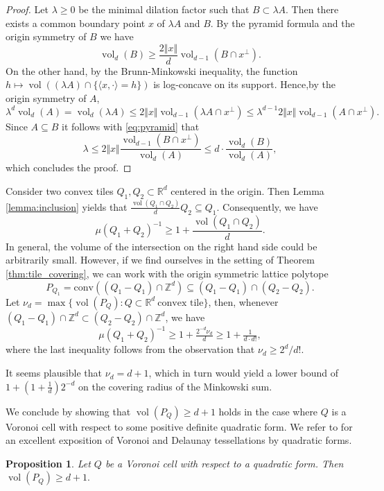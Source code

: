 \documentclass[11pt, a4paper]{amsart}
\newcommand{\RR}{\mathbb{R}}
\newcommand{\ZZ}{\mathbb{Z}}
\newcommand{\conv}{\mathrm{conv}}
\DeclareMathOperator{\vol}{vol}
\numberwithin{equation}{section}
\theoremstyle{plain}
\newtheorem{proposition}[theorem]{Proposition}
\begin{document}
\begin{proof}
Let $\lambda \geq 0$ be the minimal dilation factor such that $B\subset \lambda A$. Then there exists a common boundary point $x$ of $\lambda A$ and $B$. By the pyramid formula and the origin symmetry of $B$ we have
\begin{equation}
\label{eq:pyramid}
\vol_d(B) \geq \frac{2 \Vert x\Vert}{d}\vol_{d-1}(B\cap x^\perp).
\end{equation}
On the other hand, by the Brunn-Minkowski inequality, the function $h\mapsto \vol((\lambda A) \cap \{\langle x,\cdot\rangle = h\})$ is log-concave on its support. Hence,by the origin symmetry of $A$,
\[
\lambda^d \vol_d(A) = \vol_d(\lambda A) \leq 2 \Vert x \Vert \vol_{d-1}(\lambda A \cap x^\perp)  \leq \lambda^{d-1} 2\Vert x\Vert \vol_{d-1}(A\cap x^\perp).
\]
Since $A\subseteq B$ it follows with \eqref{eq:pyramid} that
\[
\lambda \leq 2\Vert x\Vert \frac{\vol_{d-1}(B\cap x^\perp)}{\vol_d(A)} \leq d\cdot  \frac{\vol_d(B)}{\vol_d(A)},
\]
which concludes the proof.
\end{proof}

Consider two convex tiles $Q_1,Q_2\subset \RR^d$ centered in the origin. Then Lemma \ref{lemma:inclusion} yields that
\(
\tfrac{\vol(Q_1\cap Q_2)}{d}Q_2\subseteq Q_1.
\)
Consequently, we have
\begin{equation}
\label{eq:tile_inclusion}
\mu(Q_1 + Q_2)^{-1} \geq  1 + \frac{\vol(Q_1\cap Q_2)}{d}.
\end{equation}
In general, the volume of the intersection on the right hand side could be arbitrarily small. However, if we find ourselves in the setting of Theorem \ref{thm:tile_covering}, we can work with
the origin symmetric lattice polytope
\[
P_{Q_1} = \conv((Q_1-Q_1)\cap \ZZ^d) \subseteq (Q_1-Q_1)\cap (Q_2-Q_2).
\]
Let $\nu_d = \max\{\vol(P_{Q}) : Q\subset \RR^d~\text{convex tile}\}$, then, whenever $(Q_1 - Q_1)\cap\ZZ^d \subset (Q_2 - Q_2)\cap\ZZ^d$, we have
\[
\mu(Q_1 + Q_2)^{-1} \geq 1 + \tfrac {2^{-d}\nu_d}{d} \geq 1 + \tfrac 1 {d\cdot d!},
\]
where the last inequality follows from the observation that $\nu_d \geq 2^{d}/d!$.

It seems plausible that $\nu_d = d+1$, which in turn would yield a lower bound of $1 + (1+\tfrac 1d)2^{-d}$ on the covering radius of the Minkowski sum.

We conclude by showing that $\vol(P_Q) \geq d+1$ holds in the case where $Q$ is a Voronoi cell with respect to some positive definite quadratic form. We refer to \cite{vallentin} for an excellent exposition of Voronoi and Delaunay tessellations by quadratic forms.
\begin{proposition}
Let $Q$ be a Voronoi cell with respect to a quadratic form. Then $\vol(P_Q) \geq d+1.$
\end{proposition}
\end{document}
